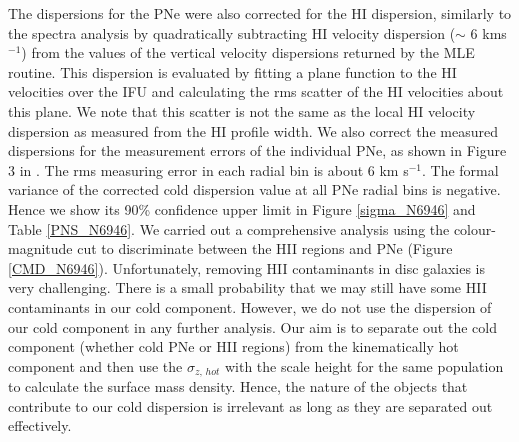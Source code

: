 \documentclass[fleqn,usenatbib]{mnras}
\begin{document}
The dispersions for the PNe were also corrected for the HI dispersion, similarly to the spectra analysis by quadratically subtracting HI velocity dispersion ($\sim$ 6 kms$^{-1}$) from the values of the vertical velocity dispersions returned by the MLE routine. This dispersion is evaluated by fitting a plane function to the HI velocities over the IFU and calculating the rms scatter of the HI velocities about this plane. We note that this scatter is not the same as the local HI velocity dispersion as measured from the HI profile width. We also correct the measured dispersions for the measurement errors of the individual PNe, as shown in Figure 3 in . The rms measuring error in each radial bin is about 6 km s$^{-1}$. The formal variance of the corrected cold dispersion value at all PNe radial bins is negative. Hence we show its 90\% confidence upper limit in Figure \ref{sigma_N6946} and Table \ref{PNS_N6946}. 
We carried out a comprehensive analysis using the colour-magnitude cut to discriminate between the  HII regions and PNe (Figure \ref{CMD_N6946}). Unfortunately, removing HII contaminants in disc galaxies is very challenging. There is a small probability that we may still have some HII contaminants in our cold component. However, we do not use the dispersion of our cold component in any further analysis. Our aim is to separate out the cold component (whether cold PNe or HII regions) from the kinematically hot component and then use the $\sigma_{z,\,hot}$ with the scale height for the same population to calculate the surface mass density. Hence, the nature of the objects that contribute to our cold dispersion is irrelevant as long as they are separated out effectively.
\end{document}
